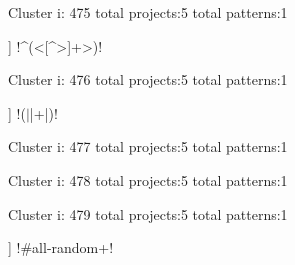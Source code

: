 Cluster i: 475
total projects:5
total patterns:1
\begin{multicols}{1}
\begin{description}[noitemsep,topsep=0pt]
\item [[5] ] \cverb!^(\s*<[^>]+>\s*)!
\end{description}
\end{multicols}







Cluster i: 476
total projects:5
total patterns:1
\begin{multicols}{1}
\begin{description}[noitemsep,topsep=0pt]
\item [[5] ] \cverb!(\(|\)|\s+|\+)!
\end{description}
\end{multicols}







Cluster i: 477
total projects:5
total patterns:1
\begin{multicols}{1}
\end{multicols}







Cluster i: 478
total projects:5
total patterns:1
\begin{multicols}{1}
\begin{description}[noitemsep,topsep=0pt]
\item [[5] ] \cverb!\(([a-zA-Z0-9_]+)=!
\end{description}
\end{multicols}







Cluster i: 479
total projects:5
total patterns:1
\begin{multicols}{1}
\begin{description}[noitemsep,topsep=0pt]
\item [[5] ] \cverb!#\s*all-random\s+!
\end{description}
\end{multicols}







